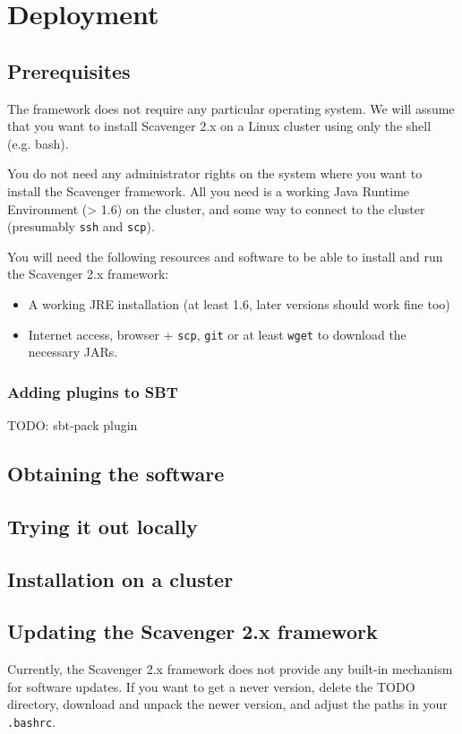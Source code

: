 \documentclass{scrbook}
\begin{document}
\chapter{Deployment}
\section{Prerequisites}
The framework does not require any particular operating system.
We will assume that you want to install Scavenger 2.x on a Linux cluster
using only the shell (e.g. bash).

You do not need any administrator rights on the system where you want
to install the Scavenger framework. 
All you need is a working Java Runtime Environment (> 1.6) on the cluster, 
and some way to connect to the cluster (presumably \lstinline{ssh} and \lstinline{scp}).

You will need the following resources and software to be able to install and run the
Scavenger 2.x framework:

\begin{itemize}
  \item A working JRE installation (at least 1.6, later versions should work fine too)
  \item Internet access, browser + \lstinline{scp}, \lstinline{git} or at least \lstinline{wget} to download
    the necessary JARs.
\end{itemize}

\subsection{Adding plugins to SBT}
TODO: sbt-pack plugin

\section{Obtaining the software}
\section{Trying it out locally}
\section{Installation on a cluster}
\section{Updating the Scavenger 2.x framework}
Currently, the Scavenger 2.x framework does not provide any built-in mechanism for
software updates. If you want to get a never version, delete the TODO directory,
download and unpack the newer version, and adjust the paths in your \lstinline{.bashrc}.
\end{document}
